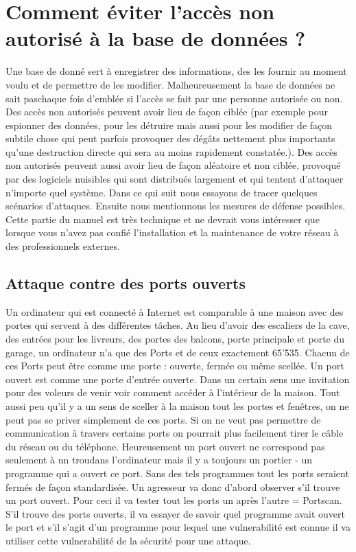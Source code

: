 \section{Comment éviter l'accès non autorisé à la base de données ?}

Une base de donné sert à enregistrer des informations, des les fournir au moment voulu et de permettre de les modifier. Malheureusement la base de données ne  \glqq sait pas\grqq chaque fois d'emblée si l'accès se fait par une personne autorisée ou non. Des accès non autorisés peuvent avoir lieu de façon ciblée (par exemple pour espionner des données, pour les détruire mais aussi pour les modifier de façon subtile chose qui peut parfois provoquer des dégâts nettement plus importants qu'une destruction directe qui sera au moins rapidement constatée.).
Des accès non autorisés peuvent aussi avoir lieu de façon aléatoire et non ciblée, provoqué par des logiciels nuisibles qui sont distribués largement et qui tentent d'attaquer n'importe quel système. Dans ce qui suit nous essayons de tracer quelques scénarios d'attaques. Ensuite nous mentionnons les mesures de défense possibles. Cette partie du manuel est très technique et ne devrait vous intéresser que lorsque vous n'avez pas confié l'installation et la maintenance de votre réseau à des professionnels externes.

\subsection{Attaque contre des ports ouverts}

Un ordinateur qui est connecté à Internet est comparable à une maison avec des portes qui servent à des différentes tâches. Au lieu d'avoir des escaliers de la cave, des entrées pour les livreurs, des  portes des balcons, porte principale et porte du garage, un ordinateur n'a que des Ports et de ceux exactement 65'535. Chacun de ces Ports peut être comme une porte : ouverte, fermée ou même scellée. Un port ouvert est comme une porte d'entrée ouverte. Dans un certain sens une invitation pour des voleurs de venir voir comment accéder à l'intérieur de la maison. Tout aussi peu qu'il y a un sens de sceller à la maison tout les portes et fenêtres, on ne peut pas se priver simplement de ces ports. Si on ne veut pas permettre de communication à travers certains ports on pourrait plus facilement tirer le câble du réseau ou du téléphone.
Heureusement un port ouvert ne correspond pas seulement à un  \glqq trou\grqq dans l'ordinateur mais il y a toujours un portier - un programme qui a ouvert ce port. Sans des tels programmes tout les ports seraient fermés de façon standardisée. Un agresseur va donc d'abord observer s'il trouve un port ouvert. Pour ceci il va tester tout les ports un après l'autre = Portscan. S'il trouve des ports ouverts, il va essayer de savoir quel programme avait ouvert le port et s'il s'agit d'un programme pour lequel une vulnerabilité est connue il va utiliser cette vulnerabilité de la sécurité pour une attaque.

